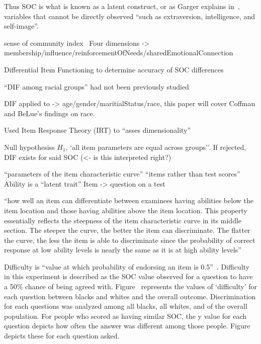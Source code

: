 \documentclass{sig-alternate}
\begin{document}
Thus SOC is what is known as a latent construct, or as Garger explains in~\cite{latent:2011}, variables that cannot be directly observed ``such as extraversion, intelligence, and self-image''.

sense of community index~\cite{disparities:2009}
Four dimensions -> membership/influence/reinforcementOfNeeds/sharedEmotionalConnection

Differential Item Functioning to determine accuracy of SOC differences

``DIF among racial groups'' had not been previously studied

DIF applied to -> age/gender/maritialStatus/race, this paper will cover Coffman and BeLue's findings on race.

Used Item Response Theory (IRT) to ``asses dimensionality''

Null hypothesiss $H_1$, `all item parameters are equal across groups''. If rejected, DIF exists for said SOC (<- is this interpreted right?)


\cite{irt:2001}
``parameters of the item characteristic curve''
``items rather than test scores''
Ability is a ``latent trait''
Item -> question on a test


``how well an item can differentiate between
examinees having abilities below the item location and those having abilities
above the item location. This property essentially reflects the steepness of the
item characteristic curve in its middle section. The steeper the curve, the better
the item can discriminate. The flatter the curve, the less the item is able to
discriminate since the probability of correct response at low ability levels is
nearly the same as it is at high ability levels''

Difficulty is ``value at which probability of endorsing an item is 0.5''~\cite{disparities:2009}.
Difficulty in this experiment is described as the SOC value observed for a question to have a 50\% chance of being agreed with. Figure~%
represents the values of `difficulty' for each question between blacks and whites and the overall outcome.
Discrimination for each questions was analyzed among all blacks, all whites, and of the overall population. For people who scored as having similar SOC, the y value for each question depicts how often the answer was different among those people.
Figure~%
depicts these for each question asked. 
\end{document}

